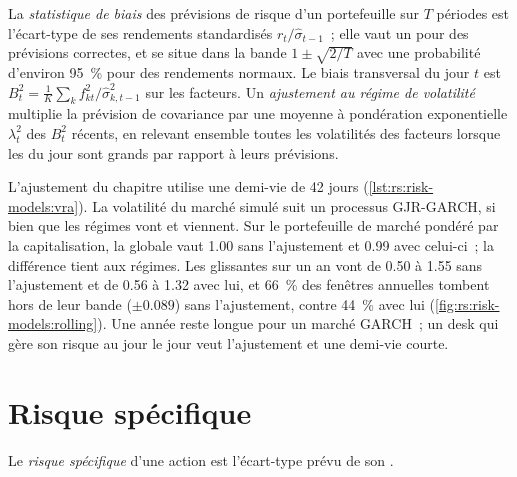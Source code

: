\begin{definition}\label{def:rs:risk-models:bias}
La \emph{statistique de biais} des prévisions de risque d'un portefeuille sur $T$ périodes est l'écart-type de ses rendements standardisés
$r_t/\hat\sigma_{t-1}$~; elle vaut un pour des prévisions correctes, et se situe dans la bande $1 \pm \sqrt{2/T}$ avec une probabilité d'environ 95~\% pour des rendements normaux. Le biais transversal du
jour $t$ est $B_t^2 = \frac1K\sum_k f_{kt}^2/\hat\sigma_{k,t-1}^2$ sur les facteurs. Un \emph{ajustement au régime de volatilité}
multiplie la prévision de covariance par une moyenne à pondération exponentielle $\lambda_t^2$ des $B_t^2$ récents, en relevant ensemble toutes les volatilités des facteurs lorsque les  du jour
sont grands par rapport à leurs prévisions.
\end{definition}

L'ajustement du chapitre utilise une demi-vie de 42 jours (\cref{lst:rs:risk-models:vra}). La volatilité du marché simulé suit un processus GJR-GARCH, si bien que les régimes
vont et viennent. Sur le portefeuille de marché pondéré par la capitalisation, la  globale vaut 1.00 sans l'ajustement et 0.99 avec celui-ci~; la différence tient aux régimes.
Les  glissantes sur un an vont de 0.50 à 1.55 sans l'ajustement et de 0.56 à 1.32 avec lui, et 66~\% des fenêtres annuelles tombent hors de leur bande
($\pm 0.089$) sans l'ajustement, contre 44~\% avec lui (\cref{fig:rs:risk-models:rolling}). Une année reste longue pour un marché GARCH~; un desk qui gère son risque
au jour le jour veut l'ajustement et une demi-vie courte.

\section{Risque spécifique}

\begin{definition}\label{def:rs:risk-models:specific}
Le \emph{risque spécifique} d'une action est l'écart-type prévu de son .
\end{definition}

